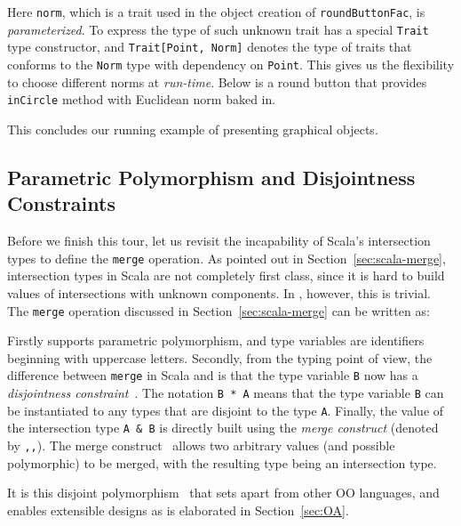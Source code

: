 \noindent Here \lstinline{norm}, which is a trait used in the object creation of
\lstinline{roundButtonFac}, is \emph{parameterized}. To express the
type of such unknown trait \name has a special 
\lstinline{Trait} type constructor, and \lstinline$Trait[Point, Norm]$
denotes the type of traits that conforms to the \lstinline$Norm$ type with dependency
on \lstinline{Point}. This gives us the
flexibility to choose different norms at \emph{run-time}. Below is a
round button that provides \lstinline{inCircle} method with Euclidean norm baked
in.

This concludes our running example of presenting graphical objects.

\subsection{Parametric Polymorphism and Disjointness Constraints}
\label{sec:merge-construct}

Before we finish this tour, let us revisit the incapability of Scala's
intersection types to define the \lstinline{merge} operation. As pointed out in
Section~\ref{sec:scala-merge}, intersection types in Scala are not completely
first class, since it is hard to build values of intersections with unknown
components. In \name, however, this is trivial. The \lstinline{merge} operation
discussed in Section~\ref{sec:scala-merge} can be written as:

\noindent Firstly \name supports parametric polymorphism, and type variables are
identifiers beginning with uppercase letters. Secondly, from the typing point of
view, the difference between \lstinline{merge} in Scala and \name is that the
type variable \lstinline{B} now has a \emph{disjointness
  constraint}~\cite{alpuimdisjoint}. The notation \lstinline{B * A} means that
the type variable \lstinline{B} can be instantiated to any types that are
disjoint to the type \lstinline{A}. Finally, the value of the intersection type
\lstinline{A & B} is directly built using the \textit{merge construct} (denoted
by \lstinline{,,}). The merge construct~\cite{dunfield2014elaborating} allows
two arbitrary values (and possible polymorphic) to be merged, with the resulting type
being an intersection type.

It is this disjoint polymorphism~\cite{alpuimdisjoint} that sets apart \name
from other OO languages, and enables extensible designs as is elaborated in
Section~\ref{sec:OA}.
